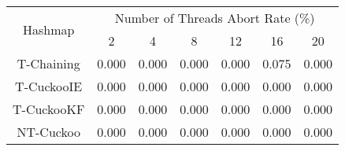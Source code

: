\begin{tabular}{|c|c|c|c|c|c|c|}
\hline
\multirow{2}{*}{Hashmap} & \multicolumn{6}{c|}{Number of Threads Abort Rate (\%)}\\\cline{2-7}& 2 & 4 & 8 & 12 & 16 & 20\\
\hline
\hline
T-Chaining & 0.000 & 0.000 & 0.000 & 0.000 & 0.075 & 0.000\\
T-CuckooIE & 0.000 & 0.000 & 0.000 & 0.000 & 0.000 & 0.000\\
T-CuckooKF & 0.000 & 0.000 & 0.000 & 0.000 & 0.000 & 0.000\\
NT-Cuckoo & 0.000 & 0.000 & 0.000 & 0.000 & 0.000 & 0.000\\
\hline
\end{tabular}
